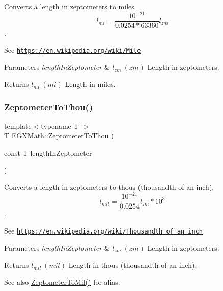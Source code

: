Converts a length in zeptometers to miles. \[ l_{mi}=\frac{10^{-21}}{0.0254 * 63360} l_{zm} \]. 

See \href{https://en.wikipedia.org/wiki/Mile}{\tt https\+://en.\+wikipedia.\+org/wiki/\+Mile} 
\begin{DoxyParams}{Parameters}
{\em length\+In\+Zeptometer} & $ l_{zm}\ (zm)$ Length in zeptometers. \\
\hline
\end{DoxyParams}
\begin{DoxyReturn}{Returns}
$ l_{mi}\ (mi)$ Length in miles. 
\end{DoxyReturn}
\mbox{\label{group___e_g_x_math-_conversions-_length_conversions-_s_i-_zeptometer-_imperial_ga14432ed712e073dcae040496f83464b6}} 
\subsubsection{\texorpdfstring{Zeptometer\+To\+Thou()}{ZeptometerToThou()}}
{\footnotesize\ttfamily template$<$typename T $>$ \\
T E\+G\+X\+Math\+::\+Zeptometer\+To\+Thou (\begin{DoxyParamCaption}\item[{const T}]{length\+In\+Zeptometer }\end{DoxyParamCaption})}



Converts a length in zeptometers to thous (thousandth of an inch). \[ l_{mil}= \frac{10^{-21}}{0.0254} l_{zm} * 10^{3} \]. 

See \href{https://en.wikipedia.org/wiki/Thousandth_of_an_inch}{\tt https\+://en.\+wikipedia.\+org/wiki/\+Thousandth\+\_\+of\+\_\+an\+\_\+inch} 
\begin{DoxyParams}{Parameters}
{\em length\+In\+Zeptometer} & $ l_{zm}\ (zm)$ Length in zeptometers. \\
\hline
\end{DoxyParams}
\begin{DoxyReturn}{Returns}
$ l_{mil}\ (mil)$ Length in thous (thousandth of an inch). 
\end{DoxyReturn}
\begin{DoxySeeAlso}{See also}
\mbox{\hyperlink{group___e_g_x_math-_conversions-_length_conversions-_s_i-_zeptometer-_imperial_ga68abfac4247069bdffc24002b0636495}{Zeptometer\+To\+Mil()}} for alias. 
\end{DoxySeeAlso}
\mbox{\label{group___e_g_x_math-_conversions-_length_conversions-_s_i-_zeptometer-_imperial_ga91e05169db4f6ae477da7428ff5a42b8}} 
